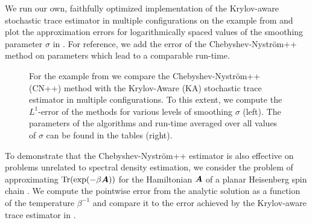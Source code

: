 We run our own, faithfully optimized implementation of the Krylov-aware stochastic trace estimator \cite[Algorithm 3.1]{chen-2023-krylovaware-stochastic} in multiple configurations on the example from  and plot the approximation errors for logarithmically spaced values of the smoothing parameter $\sigma$ in . For reference, we add the error of the Chebyshev-Nyström++ method on parameters which lead to a comparable run-time.

\begin{figure}[ht]
    \begin{minipage}[c]{.475\linewidth}
        \centering
        
    \end{minipage}\hfill%
    \begin{minipage}[c]{.475\linewidth}
        \vspace{-35pt}
        
        \newline
        \vspace{15pt}
        \newline
        
    \end{minipage}
    \caption{For the example from  we compare the Chebyshev-Nyström++ (CN++) method with the Krylov-Aware (KA) stochastic trace estimator in multiple configurations. To this extent, we compute the $L^1$-error of the methods for various levels of smoothing $\sigma$ (left). The parameters of the algorithms and run-time averaged over all values of $\sigma$ can be found in the tables (right).}
    \label{fig:krylov-aware-density}
\end{figure}

To demonstrate that the Chebyshev-Nyström++ estimator is also effective on problems unrelated to spectral density estimation, we consider the problem of approximating $\operatorname{Tr}(\exp(-\beta \boldsymbol{A}))$ for the Hamiltonian $\boldsymbol{A}$ of a planar Heisenberg spin chain \cite{chen-2023-krylovaware-stochastic}. We compute the pointwise error from the analytic solution as a function of the temperature $\beta^{-1}$ and compare it to the error achieved by the Krylov-aware trace estimator in .

